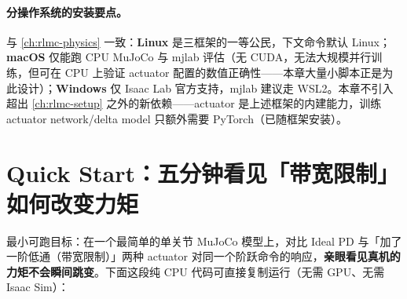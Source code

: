 \paragraph{分操作系统的安装要点。}与 \cref{ch:rlmc-physics} 一致：\textbf{Linux} 是三框架的一等公民，下文命令默认 Linux；\textbf{macOS} 仅能跑 CPU MuJoCo 与 mjlab 评估（无 CUDA，无法大规模并行训练，但可在 CPU 上验证 actuator 配置的数值正确性——本章大量小脚本正是为此设计）；\textbf{Windows} 仅 Isaac Lab 官方支持，mjlab 建议走 WSL2。本章不引入超出 \cref{ch:rlmc-setup} 之外的新依赖——actuator 是上述框架的内建能力，训练 actuator network/delta model 只额外需要 PyTorch（已随框架安装）。

\section*{Quick Start：五分钟看见「带宽限制」如何改变力矩}
\label{sec:rlmc-act-quickstart}

最小可跑目标：在一个最简单的单关节 MuJoCo 模型上，对比 Ideal PD 与「加了一阶低通（带宽限制）」两种 actuator 对同一个阶跃命令的响应，\textbf{亲眼看见真机的力矩不会瞬间跳变}。下面这段纯 CPU 代码可直接复制运行（无需 GPU、无需 Isaac Sim）：


